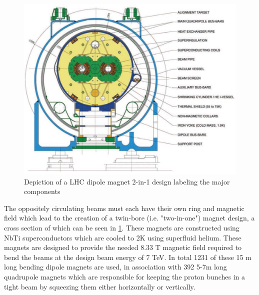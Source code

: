 \begin{figure}[!htbp] 
  \begin{center}
    \includegraphics[width=0.9\linewidth]{figures/lhc/dipole.jpg}
    \caption{ Depiction of a LHC dipole magnet 2-in-1 design labeling the major
components} 
    \label{fig:dipole} 
  \end{center} 
\end{figure}

The oppositely circulating beams must each  have their own ring and magnetic field
which lead to the creation of a twin-bore (i.e. "two-in-one") magnet design, a
cross section of which can be seen in \cref{fig:dipole}. These magnets are constructed
using NbTi superconductors which are cooled to 2K using superfluid helium.
These magnets are designed to provide the needed 8.33 T magnetic field required
to bend the beams at the design beam energy of 7 TeV.  In total 1231 of these 15
m long bending dipole magnets are used, in association with 392 5-7m long
quadrupole magnets which are responsible for keeping the proton bunches in a
tight beam by squeezing them either horizontally or vertically.
